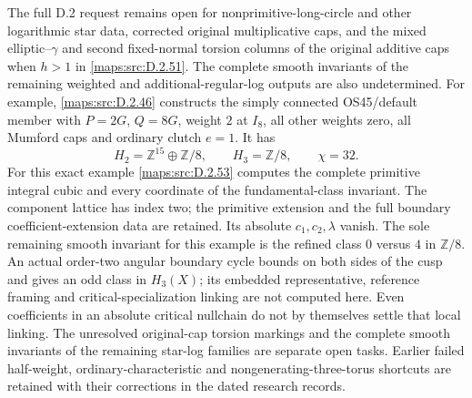 \begin{problem}
The full D.2 request remains open for nonprimitive-long-circle
and other logarithmic star data, corrected original multiplicative
caps, and the mixed elliptic--$\gamma$ and second fixed-normal
torsion columns of the original additive caps when $h>1$ in \ref{maps:src:D.2.51}.
The complete smooth invariants of the remaining weighted and
additional-regular-log outputs are also undetermined. For example, \ref{maps:src:D.2.46} constructs the
simply connected OS45/default member with $P=2G$, $Q=8G$, weight
$2$ at $I_8$, all other weights zero, all Mumford caps and ordinary
clutch $e=1$. It has
\[
 H_2=\mathbb Z^{15}\oplus\mathbb Z/8,\qquad
 H_3=\mathbb Z/8,\qquad \chi=32.
\]
For this exact example \ref{maps:src:D.2.53} computes the complete primitive
integral cubic and every coordinate of the fundamental-class
invariant. The component lattice has index two; the primitive
extension and the full boundary coefficient-extension data are
retained. Its absolute $c_1,c_2,\lambda$ vanish. The sole remaining
smooth invariant for this example is the refined class $0$ versus
$4$ in $\mathbb Z/8$. An actual order-two angular boundary cycle
bounds on both sides of the cusp and gives an odd class in $H_3(X)$;
its embedded representative, reference framing and critical-specialization
linking are not computed here. Even coefficients in an absolute critical
nullchain do not by themselves settle that local linking.
The unresolved original-cap torsion markings and the complete smooth
invariants of the remaining star-log families are separate open tasks. Earlier failed half-weight, ordinary-characteristic
and nongenerating-three-torus shortcuts are retained with their
corrections in the dated research records.


\end{problem}
